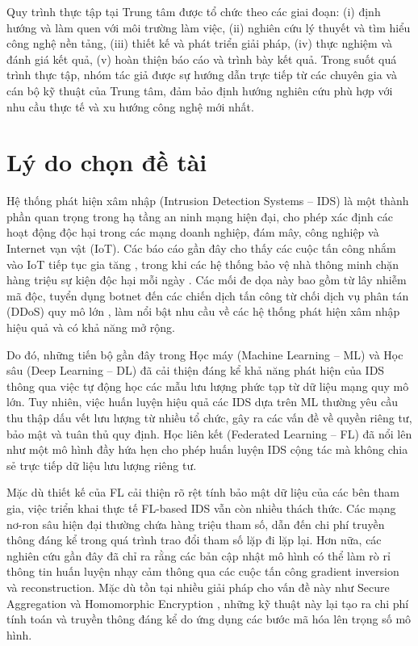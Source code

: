 Quy trình thực tập tại Trung tâm được tổ chức theo các giai đoạn: (i) định hướng và làm quen với môi trường làm việc, (ii) nghiên cứu lý thuyết và tìm hiểu công nghệ nền tảng, (iii) thiết kế và phát triển giải pháp, (iv) thực nghiệm và đánh giá kết quả, (v) hoàn thiện báo cáo và trình bày kết quả. Trong suốt quá trình thực tập, nhóm tác giả được sự hướng dẫn trực tiếp từ các chuyên gia và cán bộ kỹ thuật của Trung tâm, đảm bảo định hướng nghiên cứu phù hợp với nhu cầu thực tế và xu hướng công nghệ mới nhất.

\section{Lý do chọn đề tài}
\label{sec:reason}

Hệ thống phát hiện xâm nhập (Intrusion Detection Systems -- IDS) là một thành phần quan trọng trong hạ tầng an ninh mạng hiện đại, cho phép xác định các hoạt động độc hại trong các mạng doanh nghiệp, đám mây, công nghiệp và Internet vạn vật (IoT). Các báo cáo gần đây cho thấy các cuộc tấn công nhắm vào IoT tiếp tục gia tăng \cite{sonicwall2024report}, trong khi các hệ thống bảo vệ nhà thông minh chặn hàng triệu sự kiện độc hại mỗi ngày \cite{netgear2024report}. Các mối đe dọa này bao gồm từ lây nhiễm mã độc, tuyển dụng botnet đến các chiến dịch tấn công từ chối dịch vụ phân tán (DDoS) quy mô lớn \cite{hackernews2026report}, làm nổi bật nhu cầu về các hệ thống phát hiện xâm nhập hiệu quả và có khả năng mở rộng.

Do đó, những tiến bộ gần đây trong Học máy (Machine Learning -- ML) và Học sâu (Deep Learning -- DL) đã cải thiện đáng kể khả năng phát hiện của IDS thông qua việc tự động học các mẫu lưu lượng phức tạp từ dữ liệu mạng quy mô lớn. Tuy nhiên, việc huấn luyện hiệu quả các IDS dựa trên ML thường yêu cầu thu thập dấu vết lưu lượng từ nhiều tổ chức, gây ra các vấn đề về quyền riêng tư, bảo mật và tuân thủ quy định. Học liên kết (Federated Learning -- FL) \cite{fedavg} đã nổi lên như một mô hình đầy hứa hẹn cho phép huấn luyện IDS cộng tác mà không chia sẻ trực tiếp dữ liệu lưu lượng riêng tư.

Mặc dù thiết kế của FL cải thiện rõ rệt tính bảo mật dữ liệu của các bên tham gia, việc triển khai thực tế FL-based IDS vẫn còn nhiều thách thức. Các mạng nơ-ron sâu hiện đại thường chứa hàng triệu tham số, dẫn đến chi phí truyền thông đáng kể trong quá trình trao đổi tham số lặp đi lặp lại. Hơn nữa, các nghiên cứu gần đây đã chỉ ra rằng các bản cập nhật mô hình có thể làm rò rỉ thông tin huấn luyện nhạy cảm thông qua các cuộc tấn công gradient inversion và reconstruction. Mặc dù tồn tại nhiều giải pháp cho vấn đề này như Secure Aggregation \cite{bonawitz2016secagg} và Homomorphic Encryption \cite{li2020deepfed}, những kỹ thuật này lại tạo ra chi phí tính toán và truyền thông đáng kể do ứng dụng các bước mã hóa lên trọng số mô hình.


